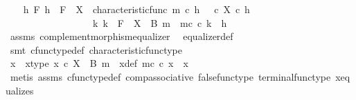 \begin{isabellebody}
\ \ \isamarkupfalse%
\ {\isachardoublequoteopen}{\isasymAnd}h\ F{\isachardot}{\kern0pt}\ h\ {\isacharcolon}{\kern0pt}\ F\ {\isasymrightarrow}\ X\ {\isasymand}\ characteristic{\isacharunderscore}{\kern0pt}func\ m\ {\isasymcirc}\isactrlsub c\ h\ {\isacharequal}{\kern0pt}\ {\isacharparenleft}{\kern0pt}{\isasymf}\ {\isasymcirc}\isactrlsub c\ {\isasymbeta}\isactrlbsub X\isactrlesub {\isacharparenright}{\kern0pt}\ {\isasymcirc}\isactrlsub c\ h\ {\isasymlongrightarrow}\isanewline
\ \ \ \ \ \ \ \ \ \ \ \ \ \ \ \ \ \ {\isacharparenleft}{\kern0pt}{\isasymexists}{\isacharbang}{\kern0pt}k{\isachardot}{\kern0pt}\ k\ {\isacharcolon}{\kern0pt}\ F\ {\isasymrightarrow}\ X\ {\isasymsetminus}\ {\isacharparenleft}{\kern0pt}B{\isacharcomma}{\kern0pt}\ m{\isacharparenright}{\kern0pt}\ {\isasymand}\ m\isactrlsup c\ {\isasymcirc}\isactrlsub c\ k\ {\isacharequal}{\kern0pt}\ h{\isacharparenright}{\kern0pt}{\isachardoublequoteclose}\isanewline
\ \ \ \ \isamarkupfalse%
\ assms\ complement{\isacharunderscore}{\kern0pt}morphism{\isacharunderscore}{\kern0pt}equalizer\ \isamarkupfalse%
\ equalizer{\isacharunderscore}{\kern0pt}def\isanewline
\ \ \ \ \isamarkupfalse%
\ {\isacharparenleft}{\kern0pt}smt\ cfunc{\isacharunderscore}{\kern0pt}type{\isacharunderscore}{\kern0pt}def\ characteristic{\isacharunderscore}{\kern0pt}func{\isacharunderscore}{\kern0pt}type{\isacharparenright}{\kern0pt}\ \isanewline
\ \ \isamarkupfalse%
\ \isamarkupfalse%
\ x{\isacharprime}{\kern0pt}\ \ x{\isacharprime}{\kern0pt}{\isacharunderscore}{\kern0pt}type{\isacharcolon}{\kern0pt}\ {\isachardoublequoteopen}x{\isacharprime}{\kern0pt}\ {\isasymin}\isactrlsub c\ X\ {\isasymsetminus}\ {\isacharparenleft}{\kern0pt}B{\isacharcomma}{\kern0pt}\ m{\isacharparenright}{\kern0pt}{\isachardoublequoteclose}\ \ x{\isacharprime}{\kern0pt}{\isacharunderscore}{\kern0pt}def{\isacharcolon}{\kern0pt}\ {\isachardoublequoteopen}m\isactrlsup c\ {\isasymcirc}\isactrlsub c\ x{\isacharprime}{\kern0pt}\ {\isacharequal}{\kern0pt}\ x{\isachardoublequoteclose}\isanewline
\ \ \ \ \isamarkupfalse%
\ {\isacharparenleft}{\kern0pt}metis\ assms{\isacharparenleft}{\kern0pt}{}{\isacharparenright}{\kern0pt}\ cfunc{\isacharunderscore}{\kern0pt}type{\isacharunderscore}{\kern0pt}def\ comp{\isacharunderscore}{\kern0pt}associative\ false{\isacharunderscore}{\kern0pt}func{\isacharunderscore}{\kern0pt}type\ terminal{\isacharunderscore}{\kern0pt}func{\isacharunderscore}{\kern0pt}type\ x{\isacharunderscore}{\kern0pt}equalizes{\isacharparenright}{\kern0pt}\isanewline

\end{isabellebody}

